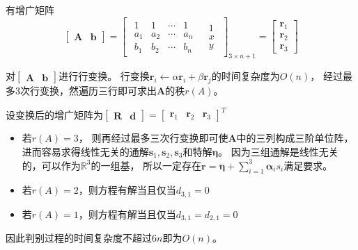 \begin{questions}
\begin{solution}
        有增广矩阵
        \[
            \begin{bmatrix}
                \bm A & \bm b
            \end{bmatrix}
            = \left[
                \begin{array}{c|c}
                    \begin{matrix}
                        1   & 1   & \cdots & 1   \\
                        a_1 & a_2 & \cdots & a_n \\
                        b_1 & b_2 & \cdots & b_n
                    \end{matrix} &
                    \begin{matrix}
                        1 \\
                        x \\
                        y
                    \end{matrix}
                \end{array}
                \right]_{3\times n+1}
            =\begin{bmatrix}
                \bm r_1 \\ \bm r_2 \\ \bm r_3
            \end{bmatrix}
        \]

        对$\begin{bmatrix} \bm A & \bm b \end{bmatrix}$进行行变换。
        行变换$\bm r_i \gets \alpha \bm r_i + \beta \bm r_j$的时间复杂度为$O(n)$，
        经过最多3次行变换，然遍历三行即可求出$\bm A$的秩$r(A)$。


        设变换后的增广矩阵为$
            \begin{bmatrix} \bm R & \bm d \end{bmatrix}
            =\begin{bmatrix}
                \bm r_1 & \bm r_2 & \bm r_3
            \end{bmatrix}^T
        $
        \begin{itemize}
            \item 若$r(A) = 3$，
                  则再经过最多三次行变换即可使$\bm A$中的三列构成三阶单位阵，
                  进而容易求得线性无关的通解$\bm s_1,\bm s_2,\bm s_3$和特解$\bm \eta$。
                  因为三组通解是线性无关的，可以作为$\mathbb{R}^3$的一组基，
                  所以一定存在$\bm r = \bm \eta + \sum_{i=1}^3 \bm \alpha_i s_i$满足要求。
            \item 若$r(A) = 2$，则方程有解当且仅当$d_{3,1} = 0$
            \item 若$r(A) = 1$，则方程有解当且仅当$d_{3,1} = d_{2,1} = 0$
        \end{itemize}

        因此判别过程的时间复杂度不超过$6n$即为$O(n)$。
    \end{solution}

\end{questions}
